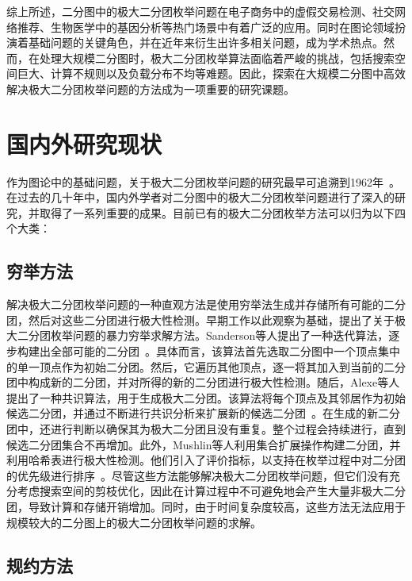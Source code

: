 综上所述，二分图中的极大二分团枚举问题在电子商务中的虚假交易检测、社交网络推荐、生物医学中的基因分析等热门场景中有着广泛的应用。同时在图论领域扮演着基础问题的关键角色，并在近年来衍生出许多相关问题，成为学术热点。然而，在处理大规模二分图时，极大二分团枚举算法面临着严峻的挑战，包括搜索空间巨大、计算不规则以及负载分布不均等难题。因此，探索在大规模二分图中高效解决极大二分团枚举问题的方法成为一项重要的研究课题。



\section{国内外研究现状}
\label{sec:related}

作为图论中的基础问题，关于极大二分团枚举问题的研究最早可追溯到1962年~\cite{MBE62}。在过去的几十年中，国内外学者对二分图中的极大二分团枚举问题进行了深入的研究，并取得了一系列重要的成果。目前已有的极大二分团枚举方法可以归为以下四个大类：

\subsection{穷举方法}

解决极大二分团枚举问题的一种直观方法是使用穷举法生成并存储所有可能的二分团，然后对这些二分团进行极大性检测。早期工作以此观察为基础，提出了关于极大二分团枚举问题的暴力穷举求解方法。Sanderson等人提出了一种迭代算法，逐步构建出全部可能的二分团~\cite{exhaust03}。具体而言，该算法首先选取二分图中一个顶点集中的单一顶点作为初始二分团。然后，它遍历其他顶点，逐一将其加入到当前的二分团中构成新的二分团，并对所得的新的二分团进行极大性检测。随后，Alexe等人提出了一种共识算法，用于生成极大二分团。该算法将每个顶点及其邻居作为初始候选二分团，并通过不断进行共识分析来扩展新的候选二分团~\cite{MICA04}。在生成的新二分团中，还进行判断以确保其为极大二分团且没有重复。整个过程会持续进行，直到候选二分团集合不再增加。此外，Mushlin等人利用集合扩展操作构建二分团，并利用哈希表进行极大性检测。他们引入了评价指标，以支持在枚举过程中对二分团的优先级进行排序~\cite{exhaust07}。尽管这些方法能够解决极大二分团枚举问题，但它们没有充分考虑搜索空间的剪枝优化，因此在计算过程中不可避免地会产生大量非极大二分团，导致计算和存储开销增加。同时，由于时间复杂度较高，这些方法无法应用于规模较大的二分图上的极大二分团枚举问题的求解。

\subsection{规约方法}

